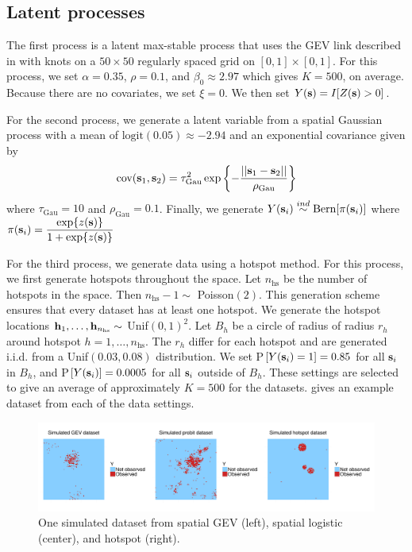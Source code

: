 \documentclass[11pt]{article}
\begin{document}
\subsection{Latent processes} \label{rbs:simsettings}
The first process is a latent max-stable process that uses the GEV link described in  with knots on a $50 \times 50$ regularly spaced grid on $[0, 1] \times [0, 1]$.
For this process, we set $\alpha = 0.35$, $\rho = 0.1$, and $\beta_0 \approx 2.97$ which gives $K = 500$, on average.
Because there are no covariates, we set $\xi = 0$.
We then set $Y(\mbox{\bf s}) = I[Z(\mbox{\bf s}) > 0]$.

For the second process, we generate a latent variable from a spatial Gaussian process with a mean of $\text{logit}(0.05) \approx -2.94$ and an exponential covariance given by
\begin{align}
  \text{cov}(\mbox{\bf s}_1, \mbox{\bf s}_2) = \tau_\text{Gau}^2 \exp\left\{- \frac{||\mbox{\bf s}_1 - \mbox{\bf s}_2||}{\rho_\text{Gau}}\right\}
\end{align}
where $\tau_\text{Gau} = 10$ and $\rho_\text{Gau} = 0.1$.
Finally, we generate $Y(\mbox{\bf s}_i) \stackrel{ind}{\sim} \text{Bern}[\pi(\mbox{\bf s}_i)]$
where $\pi(\mbox{\bf s}_i) = \displaystyle \frac{ \exp\{z(\mbox{\bf s})\}}{1 + \exp\{z(\mbox{\bf s})\} }$

For the third process, we generate data using a hotspot method.
For this process, we first generate hotspots throughout the space.
Let $n_\text{hs}$ be the number of hotspots in the space.
Then $n_\text{hs} - 1 \sim$ Poisson$(2)$.
This generation scheme ensures that every dataset has at least one hotspot.
We generate the hotspot locations $\mbox{\bf h}_1, \ldots, \mbox{\bf h}_{n_\text{hs}} \sim$ Unif$(0, 1)^2$.
Let $B_h$ be a circle of radius of radius $r_h$ around hotspot $h = 1, \ldots, n_\text{hs}$.
The $r_h$ differ for each hotspot and are generated i.i.d. from a Unif$(0.03, 0.08)$ distribution.
We set P$[Y(\mbox{\bf s}_i) = 1] = 0.85$ for all $\mbox{\bf s}_i$ in $B_h$, and P$[Y(\mbox{\bf s}_i)] = 0.0005$ for all $\mbox{\bf s}_i$ outside of $B_h$.
These settings are selected to give an average of approximately $K = 500$ for the datasets.
 gives an example dataset from each of the data settings.

\begin{figure}
  \centering
  \includegraphics[width=\linewidth, trim=0 1in 0 1in]{plots/simulateddata}
  \caption{One simulated dataset from spatial GEV (left), spatial logistic (center), and hotspot (right).}
  \label{rbfig:simulateddata}
\end{figure}
\end{document}
